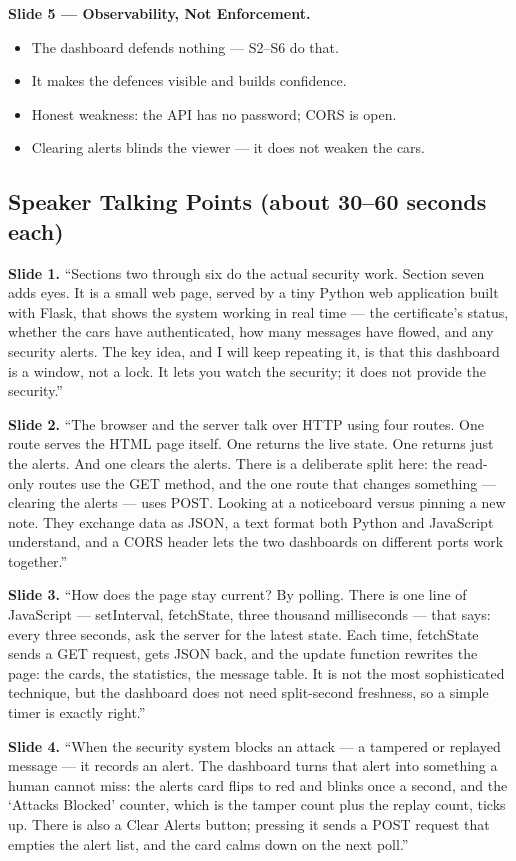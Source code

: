 \documentclass[11pt,a4paper]{article}
\begin{document}
\textbf{Slide 5 --- Observability, Not Enforcement.}
\begin{itemize}
  \item The dashboard defends nothing --- S2--S6 do that.
  \item It makes the defences visible and builds confidence.
  \item Honest weakness: the API has no password; CORS is open.
  \item Clearing alerts blinds the viewer --- it does not weaken the cars.
\end{itemize}

\subsection{Speaker Talking Points (about 30--60 seconds each)}

\textbf{Slide 1.} ``Sections two through six do the actual security work. Section
seven adds eyes. It is a small web page, served by a tiny Python web application
built with Flask, that shows the system working in real time --- the
certificate's status, whether the cars have authenticated, how many messages have
flowed, and any security alerts. The key idea, and I will keep repeating it, is
that this dashboard is a window, not a lock. It lets you watch the security; it
does not provide the security.''

\textbf{Slide 2.} ``The browser and the server talk over HTTP using four routes.
One route serves the HTML page itself. One returns the live state. One returns
just the alerts. And one clears the alerts. There is a deliberate split here: the
read-only routes use the GET method, and the one route that changes something ---
clearing the alerts --- uses POST. Looking at a noticeboard versus pinning a new
note. They exchange data as JSON, a text format both Python and JavaScript
understand, and a CORS header lets the two dashboards on different ports work
together.''

\textbf{Slide 3.} ``How does the page stay current? By polling. There is one line
of JavaScript --- setInterval, fetchState, three thousand milliseconds --- that
says: every three seconds, ask the server for the latest state. Each time,
fetchState sends a GET request, gets JSON back, and the update function rewrites
the page: the cards, the statistics, the message table. It is not the most
sophisticated technique, but the dashboard does not need split-second freshness,
so a simple timer is exactly right.''

\textbf{Slide 4.} ``When the security system blocks an attack --- a tampered or
replayed message --- it records an alert. The dashboard turns that alert into
something a human cannot miss: the alerts card flips to red and blinks once a
second, and the `Attacks Blocked' counter, which is the tamper count plus the
replay count, ticks up. There is also a Clear Alerts button; pressing it sends a
POST request that empties the alert list, and the card calms down on the next
poll.''
\end{document}
